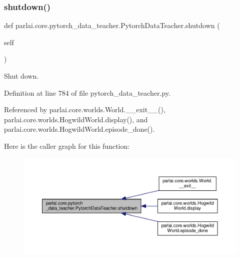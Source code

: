 \mbox{\label{classparlai_1_1core_1_1pytorch__data__teacher_1_1PytorchDataTeacher_a20ae09e79b2747f8f4c769dda0453937}} 
\subsubsection{\texorpdfstring{shutdown()}{shutdown()}}
{\footnotesize\ttfamily def parlai.\+core.\+pytorch\+\_\+data\+\_\+teacher.\+Pytorch\+Data\+Teacher.\+shutdown (\begin{DoxyParamCaption}\item[{}]{self }\end{DoxyParamCaption})}

\begin{DoxyVerb}Shut down.\end{DoxyVerb}
 

Definition at line 784 of file pytorch\+\_\+data\+\_\+teacher.\+py.



Referenced by parlai.\+core.\+worlds.\+World.\+\_\+\+\_\+exit\+\_\+\+\_\+(), parlai.\+core.\+worlds.\+Hogwild\+World.\+display(), and parlai.\+core.\+worlds.\+Hogwild\+World.\+episode\+\_\+done().

Here is the caller graph for this function\+:
\nopagebreak
\begin{figure}[H]
\begin{center}
\leavevmode
\includegraphics[width=350pt]{classparlai_1_1core_1_1pytorch__data__teacher_1_1PytorchDataTeacher_a20ae09e79b2747f8f4c769dda0453937_icgraph}
\end{center}
\end{figure}


